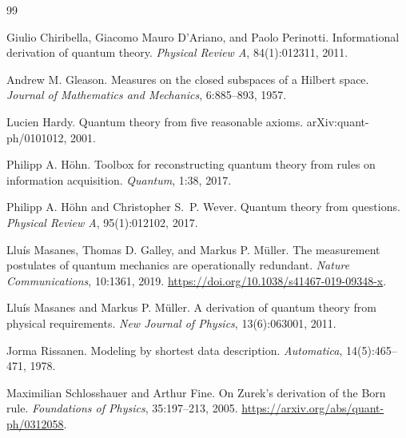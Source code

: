 \documentclass[11pt,a4paper]{article}
\theoremstyle{remark}\newtheorem{remark}[definition]{Remark}
\begin{document}
\begin{thebibliography}{99}

Giulio Chiribella, Giacomo Mauro D'Ariano, and Paolo Perinotti.
\newblock Informational derivation of quantum theory.
\newblock \emph{Physical Review A}, 84(1):012311, 2011.

Andrew M. Gleason.
\newblock Measures on the closed subspaces of a Hilbert space.
\newblock \emph{Journal of Mathematics and Mechanics}, 6:885--893, 1957.

Lucien Hardy.
\newblock Quantum theory from five reasonable axioms.
\newblock arXiv:quant-ph/0101012, 2001.

Philipp A. H\"ohn.
\newblock Toolbox for reconstructing quantum theory from rules on information acquisition.
\newblock \emph{Quantum}, 1:38, 2017.

Philipp A. H\"ohn and Christopher S.~P. Wever.
\newblock Quantum theory from questions.
\newblock \emph{Physical Review A}, 95(1):012102, 2017.

Llu\'is Masanes, Thomas D. Galley, and Markus P. M\"uller.
\newblock The measurement postulates of quantum mechanics are operationally redundant.
\newblock \emph{Nature Communications}, 10:1361, 2019.
\newblock \url{https://doi.org/10.1038/s41467-019-09348-x}.

Llu\'is Masanes and Markus P. M\"uller.
\newblock A derivation of quantum theory from physical requirements.
\newblock \emph{New Journal of Physics}, 13(6):063001, 2011.

Jorma Rissanen.
\newblock Modeling by shortest data description.
\newblock \emph{Automatica}, 14(5):465--471, 1978.

Maximilian Schlosshauer and Arthur Fine.
\newblock On Zurek's derivation of the Born rule.
\newblock \emph{Foundations of Physics}, 35:197--213, 2005.
\newblock \url{https://arxiv.org/abs/quant-ph/0312058}.

\end{thebibliography}
\end{document}
